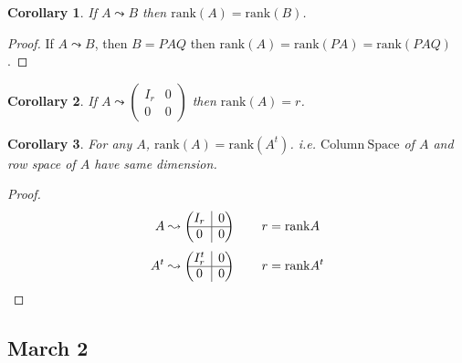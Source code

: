 \documentclass[12pt]{article}
\newtheorem{corollary}{Corollary}[subsection]
\newcommand{\rank}{\mathrm{rank}}
\newcommand{\ColSpace}{\mathrm{Column \ Space}}
\newcommand{\rvline}{\hspace*{-\arraycolsep}\vline\hspace*{-\arraycolsep}}
\begin{document}
\begin{corollary}
	If $A \leadsto B$ then $\rank(A) = \rank(B)$. 
\end{corollary}
\begin{proof}
	If $A \leadsto B$, then $B = PAQ$ then $\rank(A) = \rank(PA) = \rank(PAQ)$.
\end{proof}

\begin{corollary}
	If $A \leadsto \begin{pmatrix} I_r & 0 \\ 0 & 0
	\end{pmatrix}$ then $\rank(A) = r$. 
\end{corollary}


\begin{corollary}
	For any $A$, $\rank(A) = \rank(A^t)$. i.e. $\ColSpace$ of $A$ and row
	space of $A$ have same dimension. 
\end{corollary}
\begin{proof}
	\[
		A \leadsto 
		\begin{pmatrix}
			I_r & \rvline & 0 \\ \hline
			0 & \rvline & 0
		\end{pmatrix}
		\qquad r = \rank A
	\]
	\[
		A^t \leadsto 
		\begin{pmatrix}
			I_r^t & \rvline & 0 \\ \hline
			0 & \rvline & 0
		\end{pmatrix}
		\qquad r = \rank A^t
	\]
\end{proof}







\newpage
\subsection{March 2}
\end{document}
